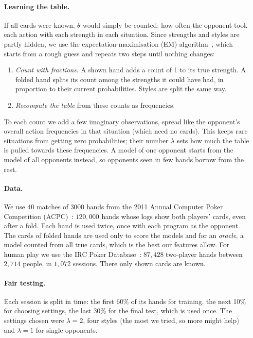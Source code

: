 \documentclass[11pt,a4paper]{article}
\begin{document}
\paragraph{Learning the table.} If all cards were known, $\theta$ would simply be
counted: how often the opponent took each action with each strength in each
situation. Since strengths and styles are partly hidden, we use the
expectation-maximisation (EM) algorithm~\cite{dempster1977}, which starts
from a rough guess and repeats two steps until nothing changes:
\begin{enumerate}
  \item \emph{Count with fractions.} A shown hand adds a count of 1 to its true
        strength. A folded hand splits its count among the strengths it could
        have had, in proportion to their current probabilities. Styles are
        split the same way.
  \item \emph{Recompute the table} from these counts as frequencies.
\end{enumerate}
To each count we add a few imaginary observations, spread like the opponent's
overall action frequencies in that situation (which need no cards). This keeps
rare situations from getting zero probabilities; their number $\lambda$ sets how
much the table is pulled towards these frequencies. A model of one opponent
starts from the model of all opponents instead, so opponents seen in few hands
borrow from the rest.

\paragraph{Data.} We use 40 matches of 3000 hands from the 2011 Annual Computer
Poker Competition (ACPC)~\cite{kim2024,phhdata}: $120{,}000$ hands whose logs
show both players' cards, even after a fold. Each hand is used twice, once with
each program as the opponent. The cards of folded hands are used only to score
the models and for an \emph{oracle}, a model counted from all true cards, which
is the best our features allow. For human play we use the IRC Poker
Database~\cite{ircdb}: $87{,}428$ two-player hands between $2{,}714$ people, in
$1{,}072$ sessions. There only shown cards are known.

\paragraph{Fair testing.} Each session is split in time: the first 60\% of its
hands for training, the next 10\% for choosing settings, the last 30\% for the
final test, which is used once. The settings chosen were $\lambda=2$, four
styles (the most we tried, so more might help) and $\lambda=1$ for single
opponents.
\end{document}
